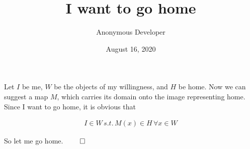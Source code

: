 \documentclass[12pt]{article}
\title{I want to go home}
\author{Anonymous Developer}
\date{August 16, 2020}
\begin{document}
\maketitle

Let $\mathit{I}$ be me, $\mathit{W}$ be the objects of my willingness, and $\mathit{H}$ be home. Now we can suggest a map $\mathit{M}$, which carries its domain onto the image representing home. Since I want to go home, it is obvious that

\begin{align*}
  {I}\in{W} \, s.t. \, {M(x)}\in {H} \, \forall x \in W
\end{align*}

So let me go home.
\hfill
$\qed$
\end{document}
